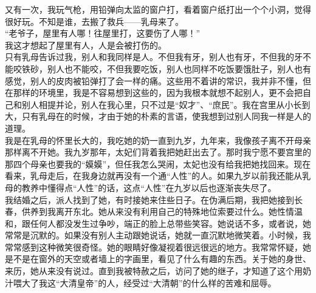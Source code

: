 又有一次，我玩气枪，用铅弹向太监的窗户打，看着窗户纸打出一个个小洞，觉得很好玩。不知是谁，去搬了救兵——乳母来了。\\

“老爷子，屋里有人哪！往屋里打，这要伤了人哪！”\\

我这才想起了屋里有人，人是会被打伤的。\\

只有乳母告诉过我，别人和我同样是人。不但我有牙，别人也有牙，不但我的牙不能咬铁砂，别人也不能咬，不但我要吃饭，别人也同样不吃饭要饿肚子，别人也有感觉，别人的皮肉被铅弹打了会一样的痛。这些用不着讲的常识，我并非不懂，但在那样的环境里，我是不容易想到这些的，因为我根本就想不起别人，更不会把自己和别人相提并论，别人在我心里，只不过是“奴才”、“庶民”。我在宫里从小长到大，只有乳母在的时候，才由于她的朴素的言语，使我想到过别人同我一样是人的道理。\\

我是在乳母的怀里长大的，我吃她的奶一直到九岁，九年来，我像孩子离不开母亲那样离不开她。我九岁那年，太妃们背着我把她赶出去了。那时我宁愿不要宫里的那四个母亲也要我的“嫫嫫”，但任我怎么哭闹，太妃也没有给我把她找回来。现在看来，乳母走后，在我身边就再没有一个通“人性”的人。如果九岁以前我还能从乳母的教养中懂得点“人性”的话，这点“人性”在九岁以后也逐渐丧失尽了。\\

我结婚之后，派人找到了她，有时接她来住些日子。在伪满后期，我把她接到长春，供养到我离开东北。她从来没有利用自己的特殊地位索要过什么。她性情温和，跟任何人都没发生过争吵，端正的脸上总带些笑容。她说话不多，或者说，她常常是沉默的。如果没有别人主动跟她说话，她就一直沉默地微笑着。小时候，我常常感到这种微笑很奇怪。她的眼睛好像凝视着很远很远的地方。我常常怀疑，她是不是在窗外的天空或者墙上的字画里，看见了什么有趣的东西。关于她的身世、来历，她从来没有说过。直到我被特赦之后，访问了她的继子，才知道了这个用奶汁喂大了我这“大清皇帝”的人，经受过“大清朝”的什么样的苦难和屈辱。\\

